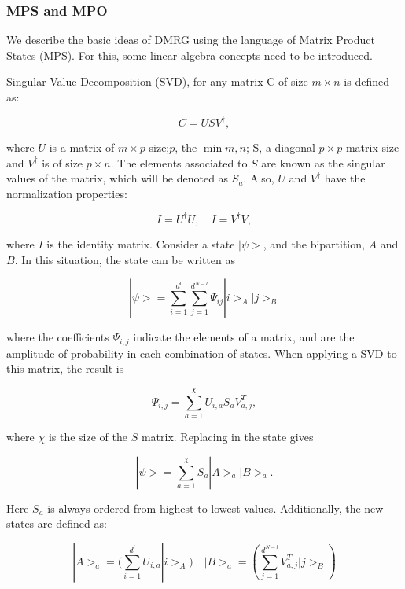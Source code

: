 \documentclass{article}
\begin{document}
\subsubsection{MPS and MPO}

We describe the basic ideas of DMRG using the language of Matrix Product States (MPS). For this, some linear algebra concepts need to be introduced. 

Singular Value Decomposition (SVD), for any matrix C of size $m\times n$ is defined as:

\begin{equation}
    C=USV^{\dagger},
\end{equation}

where $U$ is a matrix of $m\times p$ size;$p$, the $\min{m,n}$; S, a diagonal $p\times p$ matrix size and $V^\dagger$ is of size $p\times n$. The elements associated to $S$ are known as the singular values of the matrix, which will be denoted as $S_a$. Also, $U$ and $V^\dagger$ have the normalization properties:

\begin{equation}
    I=U^{\dagger}U, \quad I=V^{\dagger}V,
\end{equation}

where $I$ is the identity matrix. Consider a state $|\psi>$, and the bipartition, $A$ and $B$. In this situation, the state can be written as

\begin{equation}
    |\psi>=\sum^{d^l}_{i=1}\sum^{d^{N-l}}_{j=1}\Psi_{ij}|i>_A|j>_B
\end{equation}

where the coefficients $\Psi_{i,j}$ indicate the elements of a matrix, and are the amplitude of probability in each combination of states. When applying a SVD to this matrix, the result is

\begin{equation}
    \Psi_{i,j}=\sum^{\chi}_{a=1}U_{i,a}S_aV^T_{a,j},
\end{equation}

where $\chi$ is the size of the $S$ matrix. Replacing in the state gives

\begin{equation}
    |\psi>=\sum^{\chi}_{a=1}S_a|A>_a|B>_a.
\end{equation}

Here $S_a$ is always ordered from highest to lowest values. Additionally, the new states are defined as:

\begin{equation}
    |A>_a=(\sum^{d^{l}}_{i=1}U_{i,a}|i>_A) \quad |B>_a=(\sum^{d^{N-l}}_{j=1}V^T_{a,j}|j>_B)
\end{equation}
\end{document}
